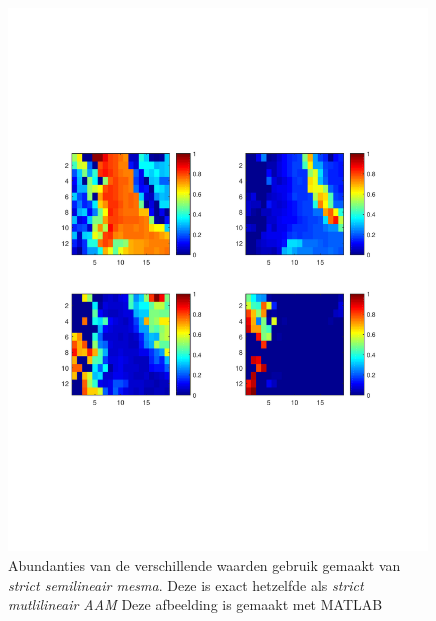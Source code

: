 \documentclass[12pt]{report}
\begin{document}
\begin{figure}
\includegraphics[width=0.99\textwidth,trim=0 200 0 175 cm]{semilinMESMA.pdf}
\caption{Abundanties van de verschillende waarden gebruik gemaakt van \textit{strict semilineair mesma}. Deze is exact hetzelfde als \textit{strict mutlilineair AAM} Deze afbeelding is gemaakt met MATLAB\cite{matlab} \label{fig:sres}}
\end{figure}
\end{document}
